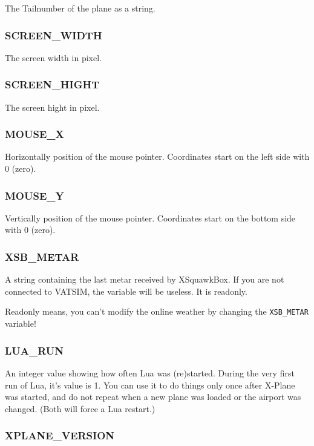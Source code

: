 \documentclass[11pt,parskip=half,a4paper]{scrartcl}
\begin{document}
The Tailnumber of the plane as a string.

\subsubsection{SCREEN\_WIDTH}

The screen width in pixel.

\subsubsection{SCREEN\_HIGHT}

The screen hight in pixel.

\subsubsection{MOUSE\_X}

Horizontally position of the mouse pointer. Coordinates start on the left side with 0 (zero).

\subsubsection{MOUSE\_Y}

Vertically position of the mouse pointer. Coordinates start on the bottom side with 0 (zero).

\subsubsection{XSB\_METAR}

A string containing the last metar received by XSquawkBox. If you are not connected to VATSIM, the variable will be useless. It is readonly.

Readonly means, you can't modify the online weather by changing the \verb|XSB_METAR| variable!

\subsubsection{LUA\_RUN}

An integer value showing how often Lua was (re)started. During the very first run of Lua, it's value is 1. You can use it to do things only once after X-Plane was started, and do not repeat when a new plane was loaded or the airport was changed. (Both will force a Lua restart.)

\subsubsection{XPLANE\_VERSION}
\end{document}
